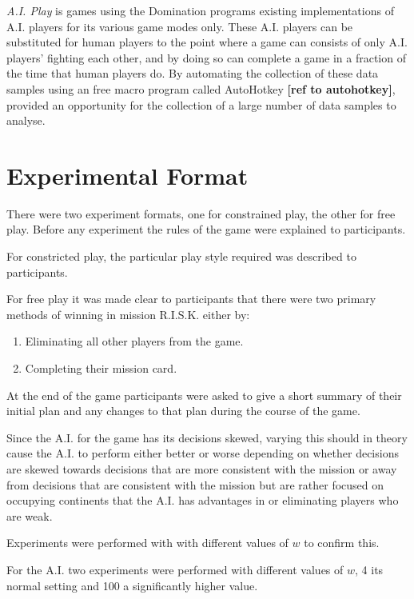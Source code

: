 \documentclass[parskip]{cs4rep}
\begin{document}
\textit{A.I. Play} is games using the Domination programs existing implementations of A.I. players for its various game modes only. These A.I. players can be substituted for human players to the point where a game can consists of only A.I. players' fighting each other, and by doing so can complete a game in a fraction of the time that human players do. By automating the collection of these data samples using an free macro program called AutoHotkey \textbf{[ref to autohotkey]}, provided an opportunity for the collection of a large number of data samples to analyse. 

\section{Experimental Format}

There were two experiment formats, one for constrained play, the other for free play. Before any experiment the rules of the game were explained to participants. 

For constricted play, the particular play style required was described to participants.

For free play it was made clear to participants that there were two primary methods of winning in mission R.I.S.K. either by:

\begin{enumerate}
\item
Eliminating all other players from the game.
\item
Completing their mission card.
\end{enumerate}

At the end of the game participants were asked to give a short summary of their initial plan and any changes to that plan during the course of the game.

Since the A.I. for the game has its decisions skewed, varying this should in theory cause the A.I. to perform either better or worse depending on whether decisions are skewed towards decisions that are more consistent with the mission or away from decisions that are consistent with the mission but are rather focused on occupying continents that the A.I. has advantages in or eliminating players who are weak.

Experiments were performed with with different values of $w$ to confirm this.

For the A.I. two experiments were performed with different values of $w$, 4 its normal setting and 100 a significantly higher value.
\end{document}
